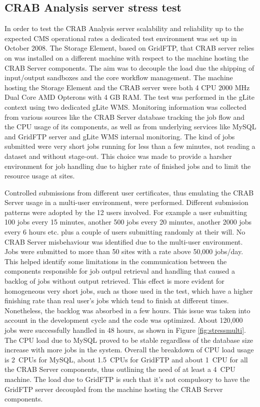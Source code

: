 \subsection{CRAB Analysis server stress test}
In order to test the CRAB Analysis server scalability and reliability up to
the expected CMS operational rates a dedicated test environment was
set up in October 2008. The Storage Element, based on GridFTP, 
that CRAB server relies on was installed on a different machine with 
respect to the machine hosting the CRAB Server components. The aim was 
to decouple the load
due the shipping of input/output sandboxes and the core workflow
management. The machine hosting the Storage Element and the CRAB
server were both 4 CPU 2000 MHz Dual Core AMD Opterons with 4 GB
RAM. The test was performed in the gLite context using two dedicated
gLite WMS. Monitoring information was collected from various sources
like the CRAB Server database tracking the job flow and the CPU usage
of its components, as well as from underlying services like MySQL and
GridFTP server and gLite WMS internal monitoring. The kind of
jobs submitted were very short jobs running for less than a few
minutes, not reading a dataset and without stage-out. This choice was
made to provide a harsher environment for job handling due to higher
rate of finished jobs and to limit the resource usage at sites.

Controlled submissions from different user certificates, thus 
emulating the CRAB Server usage in a multi-user environment, were performed.
Different submission patterns were adopted by the 12 users
involved. For example a user submitting 100 jobs every 15 minutes,
another 500 jobs every 20 minutes, another 2000 jobs every 6 hours
etc. plus a couple of users submitting randomly at their will.  No
CRAB Server misbehaviour was identified due to the multi-user
environment. %
Jobs were submitted to more than 50 sites with a rate above 50,000 jobs/day.
This helped identify some limitations in the communication between 
the components responsible for job outpul retrieval and handling that caused a backlog of jobs without output retrieved. This effect is more evident for homogeneous very short
jobs, such as those used in the test, which have a higher finishing rate
than real user's jobs which tend to finish at different times. Nonetheless, the backlog was absorbed in a few hours. This issue was
taken into account in the development cycle and the code was
optimized.  About 120,000 jobs were successfully handled in 48 hours,
as shown in Figure \ref{fig:stressmulti}.  The CPU load due to MySQL
proved to be stable regardless of the database size increase with more
jobs in the system. Overall the breakdown of CPU load usage is 2~CPUs
for MySQL, about 1.5~CPUs for GridFTP and about 1~CPU for all the CRAB
Server components, thus outlining the need of at least a 4~CPU
machine.  The load due to GridFTP is such that it's not compulsory to
have the GridFTP server decoupled from the machine hosting the CRAB
Server components.


